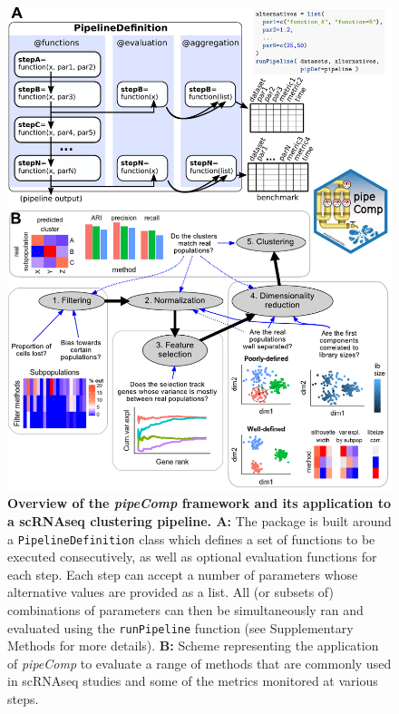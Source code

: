 \documentclass{bmcart}
\begin{document}
\begin{backmatter}
\begin{figure}
    \centering
    \ifshowfigs
    \includegraphics[width=\textwidth, keepaspectratio]{main_figures/pipeline_explanation.pdf}
    \fi
    \caption{\textbf{Overview of the \textit{pipeComp} framework and its application to a scRNAseq clustering pipeline. A:} The package is built around a \texttt{PipelineDefinition} class which defines a set of functions to be executed consecutively, as well as optional evaluation functions for each step. Each step can accept a number of parameters whose alternative values are provided as a list. All (or subsets of) combinations of parameters can then be simultaneously ran and evaluated using the \texttt{runPipeline} function (see Supplementary Methods for more details). \textbf{B:} Scheme representing the application of \textit{pipeComp} to evaluate a range of methods that are commonly used in scRNAseq studies and some of the metrics monitored at various steps.}
    \label{fig:explanation}
\end{figure}



\end{backmatter}
\end{document}
